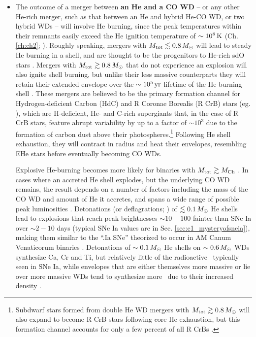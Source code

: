 \begin{itemize}
	\item The outcome of a merger between {\bf an He and a CO WD} -- or any other He-rich merger, such as that between an He and hybrid He-CO WD, or two hybrid WDs -- will involve He burning, since the peak temperatures within their remnants easily exceed the He ignition temperature of $\sim10^8\,\mathrm{K}$ (Ch. \ref{ch:ch2}; \citealt{dan+14}).  Roughly speaking, mergers with $\Mtot \lesssim 0.8\,\Msun$ will lead to steady He burning in a shell, and are thought to be the progenitors to He-rich sdO stars \citep{justph11}.  Mergers with $\Mtot \gtrsim 0.8\,\Msun$ that do not experience an explosion will also ignite shell burning, but unlike their less massive counterparts they will retain their extended envelope over the $\sim10^5\,\mathrm{yr}$ lifetime of the He-burning shell \citep{ibent85, zhanj12b}.  These mergers are believed to be the primary formation channel for Hydrogen-deficient Carbon (HdC) and R Coronae Borealis (R CrB) stars (eg. \citealt{webb84, ibent84, saioj02, clay12, zhan+14}), which are H-deficient, He- and C-rich supergiants that, in the case of R CrB stars, feature abrupt variability by up to a factor of $\sim10^3$ due to the formation of carbon dust above their photospheres.\footnote{Subdwarf stars formed from double He WD mergers with $\Mtot \gtrsim 0.8\,\Msun$ will also expand to become R CrB stars following core He exhaustion, but this formation channel accounts for only a few percent of all R CrBs \citep{zhanj12b}.}  Following He shell exhaustion, they will contract in radius and heat their envelopes, resembling EHe stars \citep{saioj02, jeff14} before eventually becoming CO WDs.

Explosive He-burning becomes more likely for binaries with $\Mtot\gtrsim\Mch$ \citep{dan+12, dan+14}.  In cases where an accreted He shell explodes, but the underlying CO WD remains, the result depends on a number of factors including the mass of the CO WD and amount of He it accretes, and spans a wide range of possible peak luminosities \citep{shen+10he, wald+11, woosk11}.  Detonations (or deflagrations; \citealt{woosk11}) of $\lesssim0.1\,\Msun$ He shells lead to explosions that reach peak brightnesses $\sim10-100$ fainter than SNe Ia over $\sim2-10$ days (typical SNe Ia values are in Sec. \ref{sec:c1_mysteryofsneia}), making them similar to the ``.Ia SNe'' theorized to occur in AM Canum Venaticorum binaries \citep{bild+07, shen+10he, woosk11, wald+11}.  Detonations of $\sim0.1\,\Msun$ He shells on $\sim0.6\,\Msun$ WDs synthesize Ca, Cr and Ti, but relatively little of the radioactive \Ni\ typically seen in SNe Ia, while envelopes that are either themselves more massive or lie over more massive WDs tend to synthesize more \Ni\ due to their increased density \citep{shen+10he, wald+11}.


\end{itemize}
